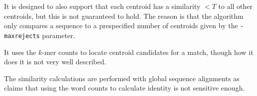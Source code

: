 It is designed to also support that each centroid has a similarity $<T$ to all
other centroids, but this is not guaranteed to hold. The reason is that the
algorithm only compares a sequence to a prespecified number of centroids given
by the \texttt{-maxrejects} parameter.

It uses the $k$-mer counts to locate centroid candidates for a match, though
how it does it is not very well described.

The similarity calculations are performed with global sequence alignments as
\cite{usearch} claims that using the word counts to calculate identity is not
sensitive enough.


